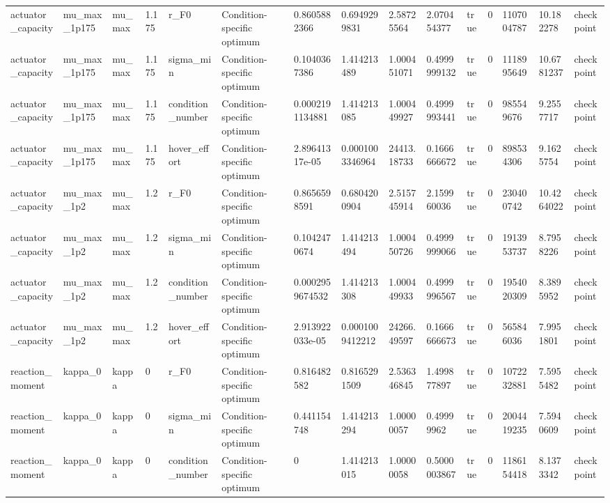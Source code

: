 \begin{tabular}{@{}lllllllllllllll@{}}
actuator\_capacity & mu\_max\_1p175 & mu\_max & 1.175 & r\_F0 & Condition-specific optimum & 0.8605882366 & 0.6949299831 & 2.58725564 & 2.070454377 & true & 0 & 1107004787 & 10.182278 & checkpoint \\
actuator\_capacity & mu\_max\_1p175 & mu\_max & 1.175 & sigma\_min & Condition-specific optimum & 0.1040367386 & 1.414213489 & 1.000451071 & 0.4999999132 & true & 0 & 1118995649 & 10.6781237 & checkpoint \\
actuator\_capacity & mu\_max\_1p175 & mu\_max & 1.175 & condition\_number & Condition-specific optimum & 0.0002191134881 & 1.414213085 & 1.000449927 & 0.4999993441 & true & 0 & 985549676 & 9.2557717 & checkpoint \\
actuator\_capacity & mu\_max\_1p175 & mu\_max & 1.175 & hover\_effort & Condition-specific optimum & 2.89641317e-05 & 0.0001003346964 & 24413.18733 & 0.1666666672 & true & 0 & 898534306 & 9.1625754 & checkpoint \\
actuator\_capacity & mu\_max\_1p2 & mu\_max & 1.2 & r\_F0 & Condition-specific optimum & 0.8656598591 & 0.6804200904 & 2.515745914 & 2.159960036 & true & 0 & 230400742 & 10.4264022 & checkpoint \\
actuator\_capacity & mu\_max\_1p2 & mu\_max & 1.2 & sigma\_min & Condition-specific optimum & 0.1042470674 & 1.414213494 & 1.000450726 & 0.4999999066 & true & 0 & 1913953737 & 8.7958226 & checkpoint \\
actuator\_capacity & mu\_max\_1p2 & mu\_max & 1.2 & condition\_number & Condition-specific optimum & 0.0002959674532 & 1.414213308 & 1.000449933 & 0.4999996567 & true & 0 & 1954020309 & 8.3895952 & checkpoint \\
actuator\_capacity & mu\_max\_1p2 & mu\_max & 1.2 & hover\_effort & Condition-specific optimum & 2.913922033e-05 & 0.0001009412212 & 24266.49597 & 0.1666666673 & true & 0 & 565846036 & 7.9951801 & checkpoint \\
reaction\_moment & kappa\_0 & kappa & 0 & r\_F0 & Condition-specific optimum & 0.816482582 & 0.8165291509 & 2.536346845 & 1.499877897 & true & 0 & 1072232881 & 7.5955482 & checkpoint \\
reaction\_moment & kappa\_0 & kappa & 0 & sigma\_min & Condition-specific optimum & 0.441154748 & 1.414213294 & 1.00000057 & 0.49999962 & true & 0 & 2004419235 & 7.5940609 & checkpoint \\
reaction\_moment & kappa\_0 & kappa & 0 & condition\_number & Condition-specific optimum & 0 & 1.414213015 & 1.00000058 & 0.5000003867 & true & 0 & 1186154418 & 8.1373342 & checkpoint \\

\end{tabular}
